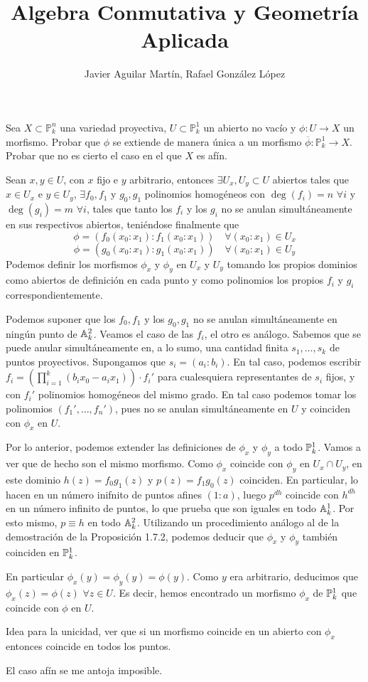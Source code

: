 \documentclass[twoside]{article}
\begin{document}
\title{Algebra Conmutativa y Geometría Aplicada}
\author{Javier Aguilar Martín, Rafael González López}
\maketitle
\begin{ejercicio}{2} Sea $X \subset \mathbb{P}^n_k$ una variedad proyectiva, $U\subset \mathbb{P}^1_k$ un abierto no vacío y $\phi\colon U\rightarrow X$ un morfismo. Probar que $\phi$ se extiende de manera única a un morfismo $\overline{\phi}\colon \mathbb{P}^1_k\rightarrow X$. Probar que no es cierto el caso en el que $X$ es afín.
\end{ejercicio}
\begin{solucion} 
 Sean $x,y\in U$, con $x$ fijo e $y$ arbitrario, entonces $\exists U_x,U_y \subset U$ abiertos tales que $x\in U_x$ e $y\in U_y$, $\exists f_0,f_1$ y $g_0,g_1$ polinomios homogéneos con $\deg(f_i)=n$ $\forall i$ y $\deg(g_i)=m$ $\forall i$, tales que tanto los $f_i$ y los $g_i$ no se anulan simultáneamente en sus respectivos abiertos, teniéndose finalmente que 
$$\phi =(f_0(x_0:x_1):f_1(x_0:x_1)) \quad \forall (x_0:x_1) \in U_x$$ 
$$\phi = (g_0(x_0:x_1):g_1(x_0:x_1)) \quad \forall (x_0:x_1) \in U_y$$
Podemos definir los morfismos $\phi_x$ y $\phi_y$ en $U_x$ y $U_y$ tomando  los propios dominios como abiertos de definición en cada punto y como polinomios los propios $f_i$ y $g_i$ correspondientemente. 

Podemos suponer que los $f_0,f_1$ y los $g_0,g_1$ no se anulan simultáneamente en ningún punto de $\mathbb{A}^2_k$. Veamos el caso de las $f_i$, el otro es análogo. Sabemos que se puede anular simultáneamente en, a lo sumo, una cantidad finita $s_1,\dotsc,s_k$ de puntos proyectivos. Supongamos que $s_i = (a_i:b_i)$. En tal caso, podemos escribir $f_i = \left(\prod_{i=1}^k (b_ix_0-a_ix_1)\right)\cdot f_i'$ para cualesquiera representantes de $s_i$ fijos, y con $f_i'$ polinomios homogéneos del mismo grado. En tal caso podemos tomar los polinomios $(f_1',\dotsc,f_n')$, pues no se anulan simultáneamente en $U$ y coinciden con $\phi_x$ en $U$. 

Por lo anterior, podemos extender las definiciones de $\phi_x$ y $\phi_y$ a todo $\mathbb{P}^1_k$. Vamos a ver que de hecho son el mismo morfismo. Como $\phi_x$ coincide con $\phi_y$ en $U_x\cap U_y$, en este dominio $h(z)=f_0g_1(z)$ y $p(z)=f_1g_0(z)$ coinciden. En particular, lo hacen en un número inifnito de puntos afines $(1:a)$, luego $p^{dh}$ coincide con $h^{dh}$ en un número infinito de puntos, lo que prueba que son iguales en todo $\mathbb{A}^1_k$. Por esto mismo, $p\equiv h$ en todo $\mathbb{A}_k^2$. Utilizando un procedimiento análogo al de la demostración de la Proposición 1.7.2, podemos deducir que $\phi_x$ y $\phi_y$ también coinciden en $\mathbb{P}^1_k$. 

En particular $\phi_x(y)=\phi_y(y)=\phi(y)$. Como $y$ era arbitrario, deducimos que $\phi_x(z)=\phi(z)$ $\forall z \in U$. Es decir, hemos encontrado un morfismo $\phi_x$ de $\mathbb{P}^1_k$ que coincide con $\phi$ en $U$.

Idea para la unicidad, ver que si un morfismo coincide en un abierto con $\phi_x$ entonces coincide en todos los puntos.

El caso afín se me antoja imposible. 	
\end{solucion}
\end{document}
